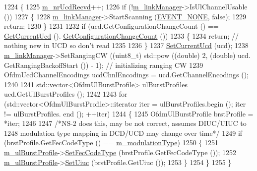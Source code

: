 \begin{DoxyCode}
1224 \{
1225   \hyperlink{classns3_1_1SubscriberStationNetDevice_ae69ebeef2cbef56a5f92b5d6c078e4c9}{m\_nrUcdRecvd}++;
1226   \textcolor{keywordflow}{if} (!\hyperlink{classns3_1_1SubscriberStationNetDevice_a24e7df59fb312c196318f0366b63c6e6}{m\_linkManager}->IsUlChannelUsable ())
1227     \{
1228       \hyperlink{classns3_1_1SubscriberStationNetDevice_a24e7df59fb312c196318f0366b63c6e6}{m\_linkManager}->StartScanning (\hyperlink{classns3_1_1SubscriberStationNetDevice_ad6dff9205fc72eef67ad77bbe6730fbba3efd1a44d9398d231a06cc3ba23c7d63}{EVENT\_NONE}, \textcolor{keyword}{false});
1229       \textcolor{keywordflow}{return};
1230     \}
1231 
1232   \textcolor{keywordflow}{if} (ucd.GetConfigurationChangeCount () == \hyperlink{classns3_1_1WimaxNetDevice_adbd7f3476ff5df6f9babaf4f5de689ae}{GetCurrentUcd} ().
      \hyperlink{classns3_1_1Ucd_a529cdb2f246cd2e61f930f4f5e6d6856}{GetConfigurationChangeCount} ())
1233     \{
1234       \textcolor{keywordflow}{return}; \textcolor{comment}{// nothing new in UCD so don't read}
1235 
1236     \}
1237   \hyperlink{classns3_1_1WimaxNetDevice_a554e03eca334044a2e3c404ded0916e5}{SetCurrentUcd} (ucd);
1238   \hyperlink{classns3_1_1SubscriberStationNetDevice_a24e7df59fb312c196318f0366b63c6e6}{m\_linkManager}->SetRangingCW ((uint8\_t) std::pow ((\textcolor{keywordtype}{double}) 2, (\textcolor{keywordtype}{double}) ucd.
      GetRangingBackoffStart ()) - 1); \textcolor{comment}{// initializing ranging CW}
1239   OfdmUcdChannelEncodings ucdChnlEncodings = ucd.GetChannelEncodings ();
1240 
1241   std::vector<OfdmUlBurstProfile> ulBurstProfiles = ucd.GetUlBurstProfiles ();
1242 
1243   \textcolor{keywordflow}{for} (std::vector<OfdmUlBurstProfile>::iterator iter = ulBurstProfiles.begin (); iter != ulBurstProfiles.
      end (); ++iter)
1244     \{
1245       OfdmUlBurstProfile brstProfile = *iter;
1246 
1247       \textcolor{comment}{/*NS-2 does this, may be not correct, assumes DIUC/UIUC to}
1248 \textcolor{comment}{       modulation type mapping in DCD/UCD may change over time*/}
1249       \textcolor{keywordflow}{if} (brstProfile.GetFecCodeType () == \hyperlink{classns3_1_1SubscriberStationNetDevice_a51692a2abe6860fa3b7d7cd8960df8d1}{m\_modulationType})
1250         \{
1251           \hyperlink{classns3_1_1SubscriberStationNetDevice_a354cbcbc741bf7413d168af01c3cf353}{m\_ulBurstProfile}->\hyperlink{classns3_1_1OfdmUlBurstProfile_a4ea1fa42525c8f13f749fcefbe90ac8f}{SetFecCodeType} (brstProfile.GetFecCodeType ());
1252           \hyperlink{classns3_1_1SubscriberStationNetDevice_a354cbcbc741bf7413d168af01c3cf353}{m\_ulBurstProfile}->\hyperlink{classns3_1_1OfdmUlBurstProfile_a2b078a5c2aaef2d8fc62be58ca2bd097}{SetUiuc} (brstProfile.GetUiuc ());
1253         \}
1254     \}
1255 \}
\end{DoxyCode}


